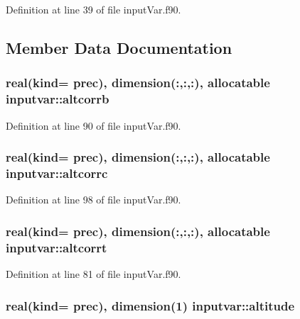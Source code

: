 Definition at line 39 of file input\-Var.\-f90.



\subsection{Member Data Documentation}
\hypertarget{classinputvar_a3fb49f59a3c5a2a19350be6bea0d69c2}{
\subsubsection[{altcorrb}]{\setlength{\rightskip}{0pt plus 5cm}real(kind= prec), dimension(\-:,\-:,\-:), allocatable inputvar\-::altcorrb}}\label{classinputvar_a3fb49f59a3c5a2a19350be6bea0d69c2}


Definition at line 90 of file input\-Var.\-f90.

\hypertarget{classinputvar_a9fe000c19d0cd93b0e53d5d6b2cbc13f}{
\subsubsection[{altcorrc}]{\setlength{\rightskip}{0pt plus 5cm}real(kind= prec), dimension(\-:,\-:,\-:), allocatable inputvar\-::altcorrc}}\label{classinputvar_a9fe000c19d0cd93b0e53d5d6b2cbc13f}


Definition at line 98 of file input\-Var.\-f90.

\hypertarget{classinputvar_a1405821026cba8a541725451f5a6f8dd}{
\subsubsection[{altcorrt}]{\setlength{\rightskip}{0pt plus 5cm}real(kind= prec), dimension(\-:,\-:,\-:), allocatable inputvar\-::altcorrt}}\label{classinputvar_a1405821026cba8a541725451f5a6f8dd}


Definition at line 81 of file input\-Var.\-f90.

\hypertarget{classinputvar_a3f078edd3f3cfd59802ac6321ad3b837}{
\subsubsection[{altitude}]{\setlength{\rightskip}{0pt plus 5cm}real(kind= prec), dimension(1) inputvar\-::altitude}}\label{classinputvar_a3f078edd3f3cfd59802ac6321ad3b837}


